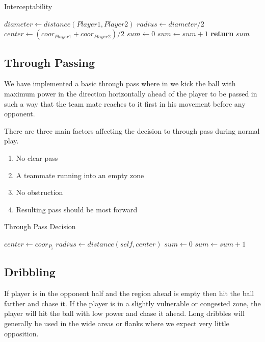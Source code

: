 \documentclass[conference,letterpaper]{IEEEtran}
\begin{document}
\begin{algorithm}[H]
\caption{Interceptability}\label{intec}
\begin{algorithmic}[1]
\State $diameter \gets distance(Player1, Player2)$
\State $radius \gets diameter / 2$
\State $center \gets (coor_{Player1} + coor_{Player2}) / 2$
\State $sum \gets 0$
\State $sum \gets sum + 1$
\EndIf
\EndFor
\State \textbf{return} $sum$
\EndProcedure
\end{algorithmic}
\end{algorithm}
	
\subsection{\bf{Through Passing}}
We have implemented a basic through pass where in we kick the ball with maximum power in the direction horizontally ahead of the player to be passed in such a way that the team mate reaches to it first in his movement before any opponent.

There are three main factors affecting the decision to through pass during normal play.
\begin{enumerate}
\item No clear pass
\item A teammate running into an empty zone
\item No obstruction
\item Resulting pass should be most forward
\end{enumerate}

\begin{algorithm}[H]
\caption{Through Pass Decision}\label{thrupass}
\begin{algorithmic}[1]
\State $center \gets coor_{P_{i}}$
\State $radius \gets distance(self, center)$
\State $sum \gets 0$
\State $sum \gets sum + 1$
\EndIf
\EndFor
\EndIf
\EndFor
\EndProcedure
\end{algorithmic}
\end{algorithm}

\subsection{\bf{Dribbling}}
If player is in the opponent half and the region ahead is empty then hit the ball farther and chase it. If the player is in a slightly vulnerable or congested zone, the player will hit the ball with low power and chase it ahead. Long dribbles will generally be used in the wide areas or flanks where we expect very little opposition.
\end{document}
